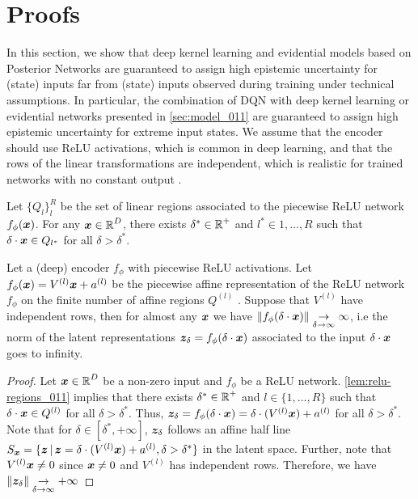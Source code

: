\section{Proofs}
\label{app:proofs}

In this section, we show that deep kernel learning \cite{due} and evidential models based on Posterior Networks \cite{charpentier2020, natpn}  are guaranteed to assign high epistemic uncertainty for (state) inputs far from (state) inputs observed during training under technical assumptions. In particular, the combination of DQN with deep kernel learning or evidential networks presented in \cref{sec:model_011} are guaranteed to assign high epistemic uncertainty for extreme input states. We assume that the encoder should use ReLU activations, which is common in deep learning, and that the rows of the linear transformations are independent, which is realistic for trained networks with no constant output \citep{overconfident-relu}.

\begin{lemma}
\label{lem:relu-regions_011}
\citep{understanding-nn-relu} Let $\{Q_l\}_l^{R}$ be the set of linear regions associated to the piecewise ReLU network $f_{\phi}(\bm{x})$. For any $\bm{x} \in \operatorname{\mathbb{R}}^D$, there exists $\delta^* \in \operatorname{\mathbb{R}}^{+}$ and $l^*\in {1,\dots, R}$ such that $\delta \cdot \bm{x} \in Q_{l^*}$ for all $\delta > \delta^*$.
\end{lemma}

\begin{lemma}
\label{lem:asymptotic-latent-norm}
Let a (deep) encoder $f_{\phi}$ with piecewise ReLU activations. Let $f_{\phi}(\bm{x})= V^{(l)}\bm{x} + a^{(l)}$ be the piecewise affine representation of the ReLU network $f_{\phi}$ on the finite number of affine regions $Q^{(l)}$ \citep{understanding-nn-relu}. Suppose that $V^{(l)}$ have independent rows, then for almost any $\bm{x}$ we have $\lVert f_{\phi}(\delta \cdot \bm{x}) \rVert \underset{\delta \rightarrow \infty}{\rightarrow} \infty$, i.e the norm of the latent representations $\bm{z}_\delta=f_{\phi}(\delta \cdot \bm{x})$ associated to the input $\delta \cdot \bm{x}$ goes to infinity.
\end{lemma}

\begin{proof}
Let $\bm{x} \in \operatorname{\mathbb{R}}^D $ be a non-zero input and $f_{\phi}$ be a ReLU network. \cref{lem:relu-regions_011} implies that there exists $\delta^* \in \operatorname{\mathbb{R}}^{+}$ and $l \in \{1,..., R\}$ such that $\delta \cdot \bm{x} \in Q^{(l)}$ for all $\delta > \delta^*$. Thus, $\bm{z}_{\delta} = f_{\phi}(\delta \cdot \bm{x}) = \delta \cdot (V^{(l)} \bm{x}) + a^{(l)}$ for all $\delta > \delta^*$. Note that for $\delta\in [\delta^*, +\infty]$,  $\bm{z}_{\delta}$ follows an affine half line $S_{\bm{x}} = \{\bm{z} \,|\, \bm{z} = \delta \cdot (V^{(l)} \bm{x}) + a^{(l)}, \delta > \delta^* \}$ in the latent space. Further, note that $V^{(l)}\bm{x} \neq 0$ since $\bm{x} \neq 0$ and $V^{(l)}$ has independent rows. Therefore, we have $\lVert \bm{z}_\delta \rVert \underset{\delta \rightarrow \infty}{\rightarrow} + \infty$
\end{proof}

